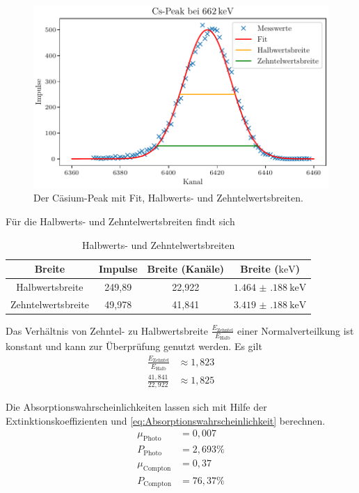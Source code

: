 \begin{figure}[H]
    \centering
    \includegraphics[width=\textwidth]{plots/CsPeak.pdf}
    \caption{Der Cäsium-Peak mit Fit, Halbwerts- und Zehntelwertsbreiten.}
    \label{fig:cspeak}
\end{figure}

Für die Halbwerts- und Zehntelwertsbreiten findt sich
\begin{table}[H]
    \centering
    \caption{Halbwerts- und Zehntelwertsbreiten}
    \label{tab:breiten}
    \begin{tabular}{c c c c}
        \toprule
        {Breite} & {Impulse} & {Breite (Kanäle)} & {Breite ($\si{\kilo\electronvolt}$)} \\
        \midrule
        Halbwertsbreite & 249,89 & 22,922 & $\qty{1.464(188)}{\kilo\electronvolt}$ \\
        Zehntelwertsbreite & 49,978 & 41,841 & $\qty{3.419(188)}{\kilo\electronvolt}$ \\
        \bottomrule
    \end{tabular}
\end{table}

Das Verhältnis von Zehntel- zu Halbwertsbreite $\frac{E_\text{Zehntel}}{E_\text{Halb}}$  einer Normalverteilkung ist konstant und kann zur Überprüfung genutzt werden. Es gilt
\begin{align}
        \frac{E_\text{Zehntel}}{E_\text{Halb}} &\approx  1,823 \\
        \frac{41,841}{22,922} &\approx 1,825
\end{align}

Die Absorptionswahrscheinlichkeiten lassen sich mit Hilfe der Extinktionskoeffizienten %
und \eqref{eq:Absorptionswahrscheinlichkeit} berechnen.
\begin{align}
    \mu_\text{Photo} &= 0,007 \\
    P_\text{Photo} &= 2,693 \% \\
    \mu_\text{Compton} &= 0,37 \\
    P_\text{Compton} &= 76,37 \%
\end{align}


